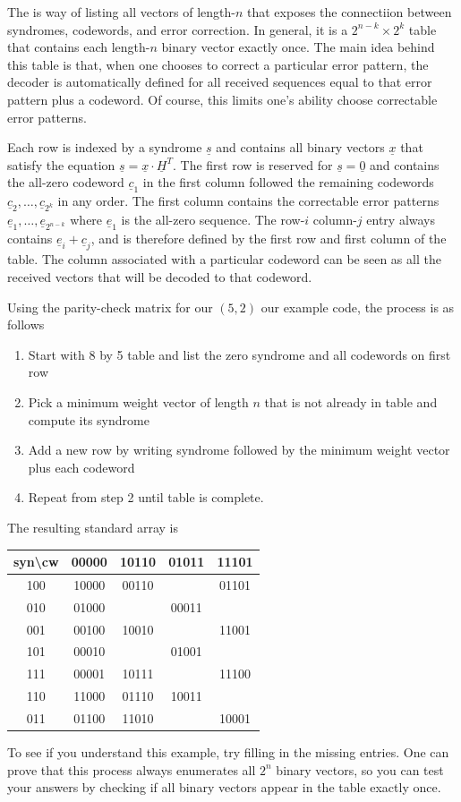 The  is way of listing all vectors of length-$n$ that exposes the connectiion between syndromes, codewords, and error correction.
In general, it is a $2^{n-k}\times 2^k$ table that contains each length-$n$ binary vector exactly once.
The main idea behind this table is that, when one chooses to correct a particular error pattern, the decoder is automatically defined for all received sequences equal to that error pattern plus a codeword.
Of course, this limits one's ability choose correctable error patterns.


Each row is indexed by a syndrome $\underline{s}$ and contains all binary vectors $\underline{x}$ that satisfy the equation $\underline{s}=\underline{x}\cdot\underline{H}^{T}$.
The first row is reserved for $\underline{s}=\underline{0}$ and contains the all-zero codeword $\underline{c}_1$ in the first column followed the remaining codewords $\underline{c}_2,\ldots,\underline{c}_{2^k}$ in any order.
The first column contains the correctable error patterns $\underline{e}_1 ,\ldots, \underline{e}_{2^{n-k}}$ where $\underline{e}_1$ is the all-zero sequence.
The row-$i$ column-$j$ entry always contains $\underline{e}_i + \underline{c}_j$, and is therefore defined by the first row and first column of the table.
The column associated with a particular codeword can be seen as all the received vectors that will be decoded to that codeword.


Using the parity-check matrix for our $(5,2)$ our example code, the process is as follows
\begin{enumerate}
\item Start with 8 by 5 table and list the zero syndrome and all codewords on first row
\item Pick a minimum weight vector of length $n$ that is not already in table and compute its syndrome
\item Add a new row by writing syndrome followed by the minimum weight vector plus each codeword
\item Repeat from step 2 until table is complete.
\end{enumerate}
The resulting standard array is
\begin{center}
\begin{tabular}{|c||c|c|c|c|}
\hline 
syn\textbackslash cw &  00000 & 10110 & 01011 & 11101\tabularnewline
\hline
\hline 
100 & 10000 & 00110 &  & 01101\tabularnewline
\hline 
010 & 01000 &  & 00011 & \tabularnewline
\hline 
001 & 00100 & 10010 &  & 11001\tabularnewline
\hline 
101 & 00010 &  & 01001 & \tabularnewline
\hline 
111 & 00001 & 10111 &  & 11100\tabularnewline
\hline 
110 & 11000 & 01110 & 10011 & \tabularnewline
\hline 
011 & 01100 & 11010 &  & 10001\tabularnewline
\hline
\end{tabular}
\end{center}
To see if you understand this example, try filling in the missing entries.
One can prove that this process always enumerates all $2^{n}$ binary vectors, so you can test your answers by checking if all binary vectors appear in the table exactly once.

